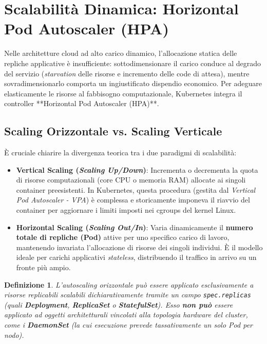 \documentclass[11pt, a4paper]{article}
\newtheorem{theorem}{Definizione}
\begin{document}
\section{Scalabilità Dinamica: Horizontal Pod Autoscaler (HPA)}

Nelle architetture cloud ad alto carico dinamico, l'allocazione statica delle repliche applicative è insufficiente: sottodimensionare il carico conduce al degrado del servizio (\emph{starvation} delle risorse e incremento delle code di attesa), mentre sovradimensionarlo comporta un ingiustificato dispendio economico. Per adeguare elasticamente le risorse al fabbisogno computazionale, Kubernetes integra il controller **Horizontal Pod Autoscaler (HPA)**.

\subsection{Scaling Orizzontale vs. Scaling Verticale}
È cruciale chiarire la divergenza teorica tra i due paradigmi di scalabilità:
\begin{itemize}[noitemsep]
    \item \textbf{Vertical Scaling (\emph{Scaling Up/Down})}: Incrementa o decrementa la quota di risorse computazionali (core CPU o memoria RAM) allocate ai singoli container preesistenti. In Kubernetes, questa procedura (gestita dal \emph{Vertical Pod Autoscaler - VPA}) è complessa e storicamente imponeva il riavvio del container per aggiornare i limiti imposti nei cgroups del kernel Linux.
    \item \textbf{Horizontal Scaling (\emph{Scaling Out/In})}: Varia dinamicamente il \textbf{numero totale di repliche (Pod)} attive per uno specifico carico di lavoro, mantenendo invariata l'allocazione di risorse dei singoli individui. È il modello ideale per carichi applicativi \emph{stateless}, distribuendo il traffico in arrivo su un fronte più ampio.
\end{itemize}

\begin{theorem}
L'autoscaling orizzontale può essere applicato esclusivamente a risorse replicabili scalabili dichiarativamente tramite un campo \texttt{spec.replicas} (quali \textbf{Deployment}, \textbf{ReplicaSet} o \textbf{StatefulSet}). Esso \textbf{non può} essere applicato ad oggetti architetturali vincolati alla topologia hardware del cluster, come i \textbf{DaemonSet} (la cui esecuzione prevede tassativamente un solo Pod per nodo).
\end{theorem}
\end{document}
